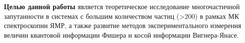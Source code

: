 \textbf{Целью данной работы} является теоретическое исследование многочастичной запутанности в системах с большим количеством частиц (>200) в рамках МК спектроскопии ЯМР,
а также развитие методов экспериментального измерения величин квантовой информации Фишера и косой информации Вигнера-Янасе.